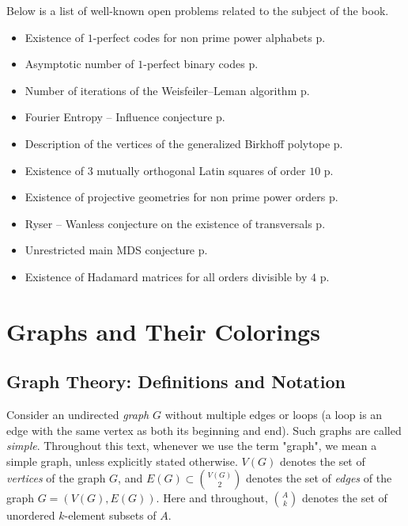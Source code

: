 \documentclass[11pt]{article}
\theoremstyle{definition}
\begin{document}
Below  is a list of well-known open problems related to the subject of the book.
\begin{itemize}
\item Existence of $1$-perfect codes for non prime power alphabets  \hfill p.\,\pageref{PCprob}
\item Asymptotic number of $1$-perfect binary codes  \hfill p.\,\pageref{Vasprob}
\item Number of iterations of the Weisfeiler--Leman algorithm \hfill p.\,\pageref{WLprob}
\item Fourier Entropy -- Influence conjecture   \hfill p.\,\pageref{FEIprob}
\item Description of the vertices of the generalized Birkhoff polytope  \hfill p.\,\pageref{Berprob}
\item Existence of $3$ mutually orthogonal Latin squares of order $10$ \hfill p.\,\pageref{LSprob}
\item Existence of projective geometries  for non prime power orders   \hfill p.\,\pageref{PGprob}
\item Ryser -- Wanless conjecture on the existence of transversals   \hfill p.\,\pageref{Tprob}
\item Unrestricted main MDS conjecture \hfill p.\,\pageref{MDSprob}
\item Existence of Hadamard matrices for all orders divisible by $4$   \hfill p.\,\pageref{Hprob}
\end{itemize}


\pagebreak

\section{Graphs and Their Colorings}

\subsection{Graph Theory: Definitions and Notation}
Consider an undirected {\sl graph} $G$ without {multiple edges} or
loops  (a loop is an edge with the same vertex as both its beginning and end). Such
graphs are called {\sl simple}. Throughout this text, whenever we use the
term
"graph", we mean a simple graph, unless explicitly stated otherwise.
$V(G)$ denotes the set of {\sl vertices} of the graph $G$, and $E(G)\subset {V(G) \choose 2}$ denotes the set of {\sl edges} of the graph
$G=(V(G),E(G))$. Here and throughout, ${A \choose k}$
denotes the set of unordered $k$-element subsets of $A$.
\end{document}
